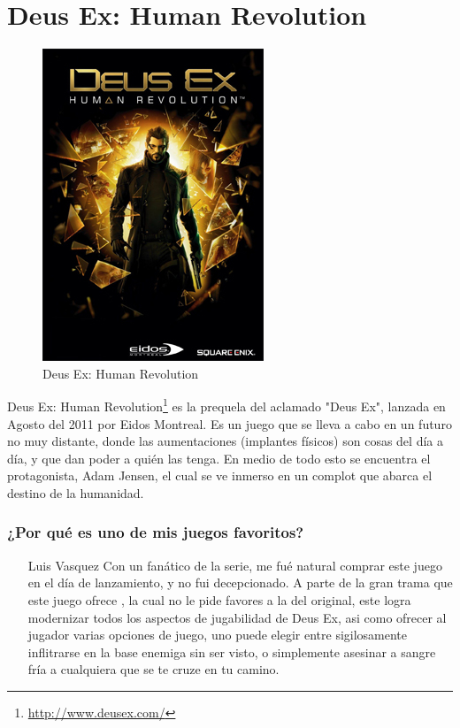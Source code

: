 \section{Deus Ex: Human Revolution}

\begin{figure}[htbp]
\begin{center}
\includegraphics[width=.60\textwidth]{./imagenes/deusex.jpg}
\caption{Deus Ex: Human Revolution}
\label{Deus Ex: Human Revolution}
\end{center}
\end{figure}
Deus Ex: Human Revolution\footnote{\url{http://www.deusex.com/}}  es la prequela del aclamado "Deus Ex", lanzada en Agosto del 2011 por Eidos Montreal. Es un juego que se lleva a cabo en un futuro no muy distante, donde las aumentaciones (implantes físicos) son cosas del día a día, y que dan poder a quién las tenga.
En medio de todo esto se encuentra el protagonista, Adam Jensen, el cual se ve inmerso en un complot que abarca el destino de la humanidad.

\subsubsection{¿Por qué es uno de mis juegos favoritos?}
\begin{itemize}
\item[Luis Vasquez] Con un fanático de la serie, me fué natural comprar este juego en el día de lanzamiento, y no fui decepcionado. A parte de la gran trama que este juego ofrece , la cual no le pide favores a la del original, este logra modernizar todos los aspectos de jugabilidad
de  Deus Ex, asi como ofrecer al jugador varias opciones de juego, uno puede elegir entre sigilosamente inflitrarse en la base enemiga sin ser visto, o simplemente asesinar a sangre fría a cualquiera que se te cruze en tu camino.
\end{itemize}
